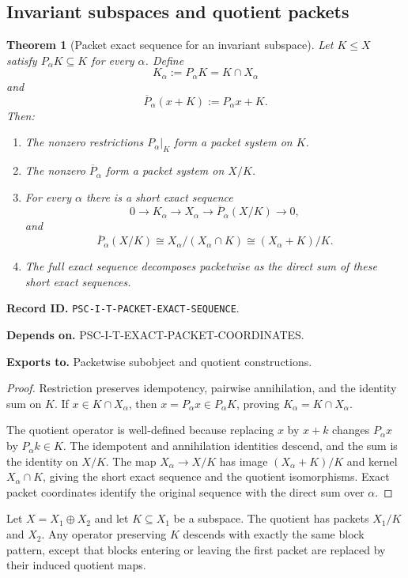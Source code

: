 \documentclass[11pt]{article}
\newtheorem{theorem}{Theorem}[section]
\theoremstyle{definition}
\theoremstyle{remark}
\newcommand{\RecordID}[1]{\par\smallskip\noindent\begingroup\footnotesize\color{PSCGray}\raggedright\textbf{Record ID.} \nolinkurl{#1}.\par\endgroup}
\newcommand{\Depends}[1]{\par\noindent\begingroup\footnotesize\color{PSCGray}\raggedright\textbf{Depends on.} #1\par\endgroup}
\newcommand{\Exports}[1]{\par\noindent\begingroup\footnotesize\color{PSCGray}\raggedright\textbf{Exports to.} #1\par\endgroup}
\begin{document}
\subsection{Invariant subspaces and quotient packets}
\begin{theorem}[Packet exact sequence for an invariant subspace]
\label{thm:packet-exact-sequence}
Let $K\leq X$ satisfy $P_\alpha K\subseteq K$ for every $\alpha$.  Define
\[
K_\alpha:=P_\alpha K=K\cap X_\alpha
\]
and
\[
\overline P_\alpha(x+K):=P_\alpha x+K.
\]
Then:
\begin{enumerate}[label=(\roman*)]
\item The nonzero restrictions $P_\alpha|_K$ form a packet system on $K$.
\item The nonzero $\overline P_\alpha$ form a packet system on $X/K$.
\item For every $\alpha$ there is a short exact sequence
\[
0\longrightarrow K_\alpha
\longrightarrow X_\alpha
\longrightarrow \overline P_\alpha(X/K)
\longrightarrow0,
\]
and
\[
\overline P_\alpha(X/K)
\cong
X_\alpha/(X_\alpha\cap K)
\cong
(X_\alpha+K)/K.
\]
\item The full exact sequence decomposes packetwise as the direct sum of these short exact sequences.
\end{enumerate}
\end{theorem}
\RecordID{PSC-I-T-PACKET-EXACT-SEQUENCE}
\Depends{PSC-I-T-EXACT-PACKET-COORDINATES.}
\Exports{Packetwise subobject and quotient constructions.}

\begin{proof}
Restriction preserves idempotency, pairwise annihilation, and the identity sum on $K$.  If $x\in K\cap X_\alpha$, then $x=P_\alpha x\in P_\alpha K$, proving $K_\alpha=K\cap X_\alpha$.

The quotient operator is well-defined because replacing $x$ by $x+k$ changes $P_\alpha x$ by $P_\alpha k\in K$.  The idempotent and annihilation identities descend, and the sum is the identity on $X/K$.  The map $X_\alpha\to X/K$ has image $(X_\alpha+K)/K$ and kernel $X_\alpha\cap K$, giving the short exact sequence and the quotient isomorphisms.  Exact packet coordinates identify the original sequence with the direct sum over $\alpha$.
\end{proof}

\begin{microexample}[title={Packet descent to a quotient}]
Let \(X=X_1\oplus X_2\) and let \(K\subseteq X_1\) be a subspace.  The quotient has packets \(X_1/K\) and \(X_2\).  Any operator preserving \(K\) descends with exactly the same block pattern, except that blocks entering or leaving the first packet are replaced by their induced quotient maps.
\end{microexample}
\end{document}
